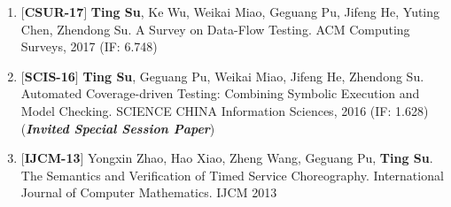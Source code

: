 \documentclass[margin]{res}
\begin{document}
\begin{resume}
\begin{enumerate}[leftmargin=*]
    \item $[$\textbf{CSUR-17}$]$ \textbf{Ting Su}, Ke Wu, Weikai Miao, Geguang Pu, Jifeng He, Yuting Chen, Zhendong Su. A Survey on Data-Flow Testing. ACM Computing Surveys, 2017 (IF: 6.748)
    \item $[$\textbf{SCIS-16}$]$ \textbf{Ting Su}, Geguang Pu, Weikai Miao, Jifeng He, Zhendong Su. Automated Coverage-driven Testing: Combining Symbolic Execution and Model Checking. SCIENCE CHINA Information Sciences, 2016 (IF: 1.628) (\textbf{\emph{Invited Special Session Paper}})
    \item $[$\textbf{IJCM-13}$]$ Yongxin Zhao, Hao Xiao, Zheng Wang, Geguang Pu, \textbf{Ting Su}. The Semantics and Verification of Timed Service Choreography. International Journal of Computer Mathematics. IJCM 2013
\end{enumerate}


\end{resume}
\end{document}
